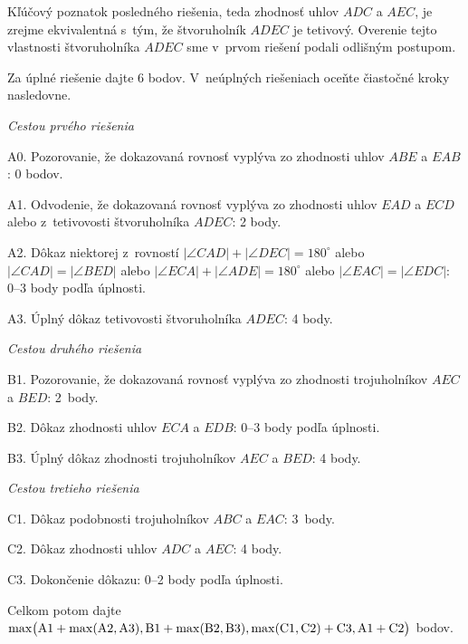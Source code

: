 {\poznamka
Kľúčový poznatok posledného riešenia, teda zhodnosť uhlov $ADC$ a $AEC$,
je zrejme ekvivalentná s~tým, že štvoruholník $ADEC$ je tetivový.
Overenie tejto vlastnosti štvoruholníka $ADEC$
sme v~prvom riešení podali odlišným postupom.

\schemaABC
Za úplné riešenie dajte 6 bodov. V~neúplných riešeniach oceňte
čiastočné kroky nasledovne.

\smallskip
\emph{Cestou prvého riešenia}
\item{A0.} Pozorovanie, že dokazovaná rovnosť vyplýva zo zhodnosti uhlov $ABE$ a $EAB$: 0 bodov.
\item{A1.} Odvodenie, že dokazovaná rovnosť vyplýva zo zhodnosti uhlov $EAD$ a $ECD$ alebo z~tetivovosti štvoruholníka $ADEC$: 2 body.
\item{A2.} Dôkaz niektorej z~rovností $|\angle CAD|+|\angle DEC|=180^\circ$ alebo $|\angle CAD|=|\angle BED|$ alebo $|\angle ECA| +|\angle ADE|= 180^\circ$ alebo $|\angle EAC|=|\angle EDC|$: 0--3 body podľa úplnosti.
\item{A3.} Úplný dôkaz tetivovosti štvoruholníka $ADEC$: 4 body.

\smallskip
\emph{Cestou druhého riešenia}
\item{B1.} Pozorovanie, že dokazovaná rovnosť vyplýva zo zhodnosti trojuholníkov $AEC$ a $BED$: 2~body.
\item{B2.} Dôkaz zhodnosti uhlov $ECA$ a $EDB$: 0--3 body podľa úplnosti.
\item{B3.} Úplný dôkaz zhodnosti trojuholníkov $AEC$ a $BED$: 4 body.

\smallskip
\emph{Cestou tretieho riešenia}
\item{C1.} Dôkaz podobnosti trojuholníkov $ABC$ a $EAC$: 3~body.
\item{C2.} Dôkaz zhodnosti uhlov $ADC$ a $AEC$: 4 body.
\item{C3.} Dokončenie dôkazu: 0--2 body podľa úplnosti.

\smallskip\noindent
Celkom potom dajte
$\rm\max\bigl(A1+\max(A2,A3),B1+\max(B2,B3), \max(C1,C2)+C3,A1+C2\bigr)$ bodov.
\endschema
}

